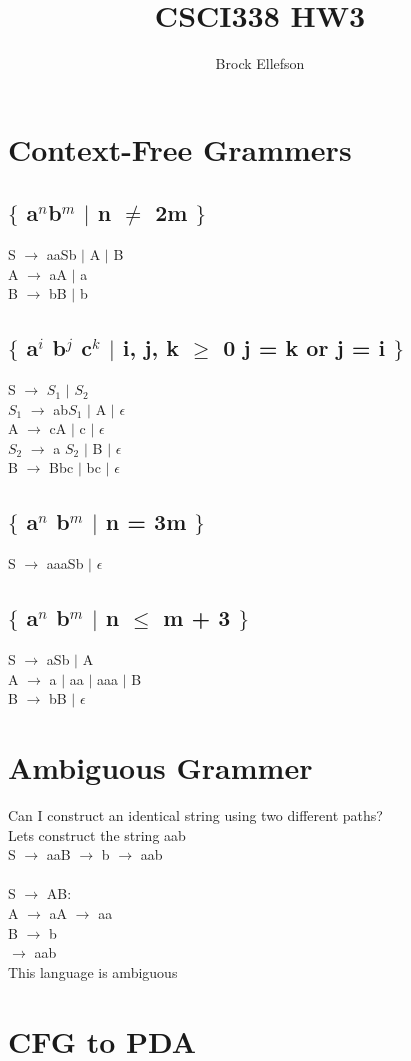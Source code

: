\documentclass[10pt,a4paper]{article}
\author{Brock Ellefson}
\title{CSCI338 HW3}
\begin{document}
\maketitle

\section{Context-Free Grammers}
\subsection{$\lbrace$ a$^{n}$b$^{m}$ $\mid$ n $\neq$ 2m $\rbrace$}
	S $\rightarrow$ aaSb $\mid$ A $\mid$ B \\
	A $\rightarrow$ aA $\mid$ a \\
	B $\rightarrow$ bB $\mid$ b
	
\subsection{$\lbrace$ a$^{i}$ b$^{j}$ c$^{k}$ $\mid$ i, j, k $\geq$ 0 j = k or j = i $\rbrace$}
	S $\rightarrow$ $S_{1}$ $\mid$ $S_{2}$ \\
	$S_{1}$  $\rightarrow$ ab$S_{1}$ $\mid$ A $\mid$ $\epsilon$ \\
	A $\rightarrow$ cA $\mid$ c $\mid$ $\epsilon$ \\
	$S_{2}$ $\rightarrow$ a $S_{2}$ $\mid$ B $\mid$ $\epsilon$ \\
	B $\rightarrow$ Bbc $\mid$ bc $\mid$ $\epsilon$
	
\subsection{$\lbrace$ a$^{n}$ b$^{m}$ $\mid$ n = 3m $\rbrace$}
	S $\rightarrow$ aaaSb $\mid$ $\epsilon$ \\
	
\subsection{$\lbrace$ a$^{n}$ b$^{m}$ $\mid$ n $\leq$ m + 3 $\rbrace$}	
	S $\rightarrow$ aSb $\mid$ A \\
	A $\rightarrow$ a $\mid$ aa $\mid$ aaa $\mid$ B \\
	B $\rightarrow$ bB  $\mid$ $\epsilon$
	
	
	
	
	 \newpage
	 
\section{Ambiguous Grammer}
	Can I construct an identical string using two different paths?\\
	Lets construct the string aab\\
	S $\rightarrow$ aaB $\rightarrow$ b $\rightarrow$ aab \\\\
	S $\rightarrow$ AB:\\
	A $\rightarrow$ aA $\rightarrow$ aa\\
	B $\rightarrow$ b\\
	$\rightarrow$ aab\\
	This language is ambiguous
	
\section{CFG to PDA}
\end{document}
